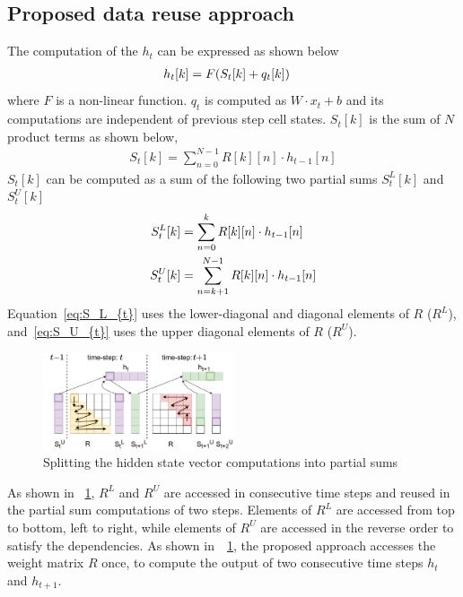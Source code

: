 \documentclass[a4paper,10pt]{article}
\begin{document}
\subsection{Proposed data reuse approach}
The computation of the $h_t$ can be expressed as shown below
\begin{align}\label{eq:h_{t}}
	h_{t}[k] &= F( S_{t}[k]+q_{t}[k])
\end{align}
where $F$ is a non-linear function. $q_{t}$ is computed as $W{\cdot}x_t{+}b$ and its computations are independent of previous step cell states. $S_{t}[k]$ is the sum of $N$ product terms as shown below,
\begin{align}
	S_{t}[k] = \sum_{n=0}^{N-1}R[k][n]\cdot h_{t-1}[n]
\end{align}
$S_{t}[k]$ can be computed as a sum of the following two partial sums $S_{t}^{L}[k]$ and $S_{t}^{U}[k]$
\begin{align}      
	S_{t}^{L}[k] &= \sum_{n=0}^{k}R[k][n]\cdot h_{t-1}[n] \label{eq:S_L_{t}}\\
	S_{t}^{U}[k] &= \sum_{n=k+1}^{N-1}R[k][n]\cdot h_{t-1}[n] \label{eq:S_U_{t}}
\end{align}
Equation~\eqref{eq:S_L_{t}} uses the lower-diagonal and diagonal elements of $R$ ($R^L$), and~\eqref{eq:S_U_{t}} uses the upper diagonal elements of $R$ ($R^U$). 
\begin{figure}[!htb]
	\centerline{\includegraphics[width=0.5\textwidth]{TwoTimeSteps.pdf}}
	\caption{Splitting the hidden state vector computations into partial sums}
	\label{fig:TwoTimeStepsComputation}
	\vspace{-1.0em}	
\end{figure}
As shown in \figurename{~\ref{fig:TwoTimeStepsComputation}}, $R^L$ and $R^U$ are accessed in consecutive time steps and reused in the partial sum computations of two steps. 
Elements of $R^L$ are accessed from top to bottom, left to right, while elements of $R^U$ are accessed in the reverse order to satisfy the dependencies. As shown in~\figurename{~\ref{fig:TwoTimeStepsComputation}}, the proposed approach accesses the weight matrix $R$ once, to compute the output of two consecutive time steps $h_{t}$ and $h_{t+1}$. 
\end{document}
